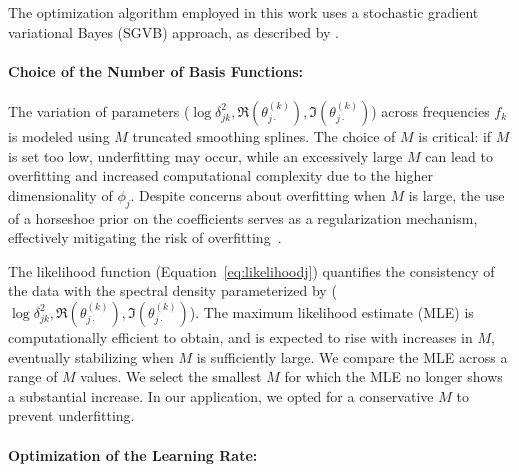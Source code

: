 \documentclass[%
 reprint,
 amsmath,amssymb,
 aps,
 nofootinbib,
]{revtex4-2}
\begin{document}
The optimization algorithm employed in this work uses a stochastic gradient variational Bayes (SGVB) approach, as described by \citet{kingma2022,Xu2019,Domke2019}. 


 

\paragraph{Choice of the Number of Basis Functions:} \label{subsec:choice_of_nbasis}


The variation of parameters ($\log \delta^2_{jk},\Re(\theta^{(k)}_{j\cdot}),\Im(\theta^{(k)}_{j\cdot})$) across frequencies $f_k$ is modeled using $M$ truncated smoothing splines. 
The choice of $M$ is critical: if $M$ is set too low, underfitting may occur, while an excessively large $M$ can lead to overfitting and increased computational complexity due to the higher dimensionality of $\phi_j$. Despite concerns about overfitting when $M$ is large, the use of a horseshoe prior on the coefficients serves as a regularization mechanism, effectively mitigating the risk of overfitting~\citep{10.1214/17-EJS1337SI}.

The likelihood function (Equation~\ref{eq:likelihoodj}) quantifies the consistency of the data with the spectral density parameterized by ($\log \delta^2_{jk},\Re(\theta^{(k)}_{j\cdot}),\Im(\theta^{(k)}_{j\cdot})$). 
The maximum likelihood estimate (MLE) is computationally efficient to obtain, and is expected to rise with increases in $M$, eventually stabilizing when $M$ is sufficiently large. 
We compare the MLE across a range of $M$ values. 
We select the smallest $M$ for which the MLE no longer shows a substantial increase. 
In our application, we opted for a conservative $M$ to prevent underfitting.



\paragraph{Optimization of the Learning Rate:}\label{subsec:learningrate}
\end{document}
